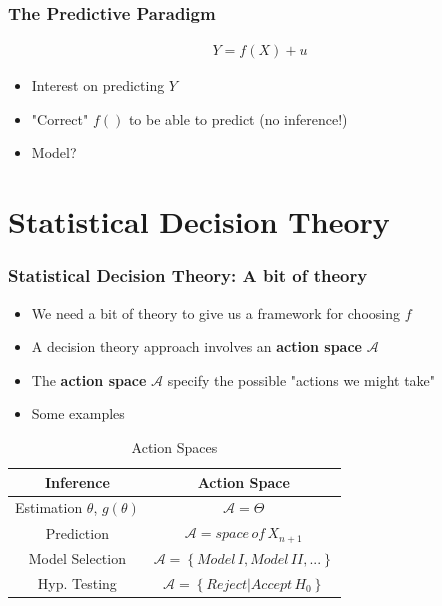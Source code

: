 \documentclass[
  shownotes,
  xcolor={svgnames},
  hyperref={colorlinks,citecolor=DarkBlue,linkcolor=DarkRed,urlcolor=DarkBlue}
  ]{beamer}
\begin{document}

\begin{frame}
\frametitle{The Predictive Paradigm}


\begin{align}
Y=f(X)+u
\end{align}

\begin{itemize}
  \item Interest on predicting $Y$
  \medskip
  \item "Correct" $f()$ to be able to predict (no inference!)
  \medskip
  \item Model? 
  
\end{itemize}


\end{frame}


\section{Statistical Decision Theory}
\begin{frame}
\frametitle{Statistical Decision Theory: A bit of theory}

\begin{itemize}
  \item We need a bit of theory to give us a framework for choosing $f$
  \item A decision theory approach involves an {\bf action space} $\mathcal{A}$
  \item The {\bf action space} $\mathcal{A}$ specify the possible "actions we might take"
  \item Some examples
\end{itemize}

\footnotesize

\begin{table}[H]
\caption{Action Spaces}

\begin{centering}
\begin{tabular}{cc}
\hline 
Inference & Action Space\\
\hline 
\hline 
Estimation $\theta$, $g\left(\theta\right)$  & $\mathcal{A}=\Theta$\\
Prediction & $\mathcal{A}=space\,of\,X_{n+1}$\\
Model Selection & $\mathcal{A}=\left\{ Model\,I,Model\,II,...\right\} $\\
Hyp. Testing & $\mathcal{A}=\left\{ Reject|Accept\,H_{0}\right\} $\\

\hline 
\end{tabular}
\par\end{centering}
\end{table}


\end{frame}
\end{document}

